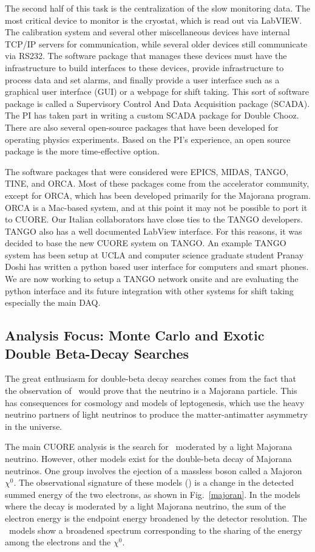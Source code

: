 The second half of this task is the centralization of the slow monitoring data. The most critical device to monitor is the cryostat, which is read out via LabVIEW. The calibration system and several other miscellaneous devices have internal TCP/IP servers for communication, while several older devices still communicate via RS232. The software package that manages these devices must have the infrastructure to build interfaces to these devices, provide infrastructure to process data and set alarms, and finally provide a user interface such as a graphical user interface (GUI) or a webpage for shift taking. This sort of software package is called a Supervisory Control And Data Acquisition package (SCADA). The PI has taken part in writing a custom SCADA package for Double Chooz. There are also several open-source packages that have been developed for operating physics experiments. Based on the PI's experience, an open source package is the more time-effective option.

The software packages that were considered were  EPICS\cite{epics}, MIDAS\cite{midas}, TANGO\cite{tango}, TINE\cite{tine}, and ORCA\cite{orca}.  Most of these packages come from the accelerator community, except for ORCA, which has been developed primarily for the Majorana program. ORCA is a Mac-based system, and at this point it may not be possible to port it to CUORE.  Our Italian collaborators have close ties to the TANGO developers. TANGO also has a well documented LabView interface. For this reasons, it was decided to base the new CUORE system on TANGO. An example TANGO  system has been setup at UCLA and computer science graduate student Pranay Doshi has written a python based user interface for computers and smart phones. We are now working to setup a TANGO network onsite and are evaluating the python interface and its future integration with other systems for shift taking especially the main DAQ.

\subsection{Analysis Focus: Monte Carlo and Exotic Double Beta-Decay Searches}
The great enthusiasm for double-beta decay searches comes from the fact that the observation of \zeronu~would prove that the neutrino is a Majorana particle. This has consequences for cosmology and models of leptogenesis, which use the heavy neutrino partners of light neutrinos to produce the matter-antimatter asymmetry in the universe. 

The main CUORE analysis is the search for \zeronu~moderated by a light Majorana neutrino.  However, other models exist for the double-beta decay of Majorana neutrinos. One group involves the ejection of a massless boson called a Majoron $\chi^{0}$. The observational signature of these models (\maj) is a change in the detected summed energy of the two electrons, as shown in Fig.~\ref{majoran}.  In the models where the decay is moderated by a light Majorana neutrino, the sum of the electron energy is the endpoint energy broadened by the detector resolution. The \maj~models show a broadened spectrum corresponding to the sharing of the energy among the electrons and the $\chi^{0}$. 

